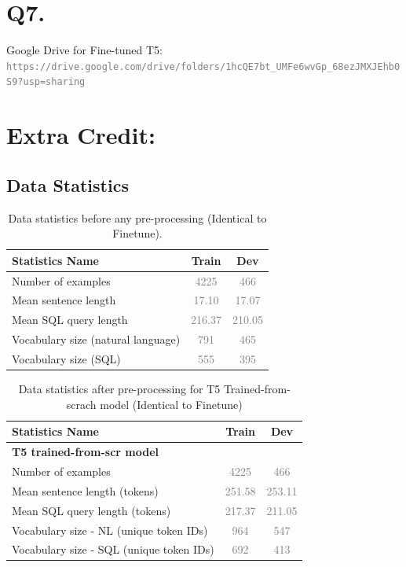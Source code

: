 \documentclass{article}
\begin{document}
\section*{Q7.}

Google Drive for Fine-tuned T5: \\
\textcolor{gray}{\nolinkurl{https://drive.google.com/drive/folders/1hcQE7bt_UMFe6wvGp_68ezJMXJEhb0S9?usp=sharing}}

\section*{Extra Credit: }

\subsection*{Data Statistics}
\begin{table}[h!]
\centering
\begin{tabular}{lcc}
\toprule
Statistics Name & Train & Dev \\
\midrule
Number of examples & \textcolor{gray}{4225} & \textcolor{gray}{466} \\
Mean sentence length & \textcolor{gray}{17.10}& \textcolor{gray}{17.07} \\
Mean SQL query length & \textcolor{gray}{216.37}& \textcolor{gray}{210.05}  \\
Vocabulary size (natural language)& \textcolor{gray}{791}& \textcolor{gray}{465}  \\
Vocabulary size (SQL)& \textcolor{gray}{555}& \textcolor{gray}{395}  \\
\bottomrule
\end{tabular}
\caption{Data statistics before any pre-processing (Identical to Finetune).}
\label{tab:data_stats_before}
\end{table}
\begin{table}[h!]
\centering
\begin{tabular}{lcc}
\toprule
Statistics Name & Train & Dev \\
\midrule
\multicolumn{3}{l}{\textbf{T5 trained-from-scr model}} \\ %
Number of examples & \textcolor{gray}{4225} & \textcolor{gray}{466} \\
Mean sentence length (tokens)& \textcolor{gray}{251.58}& \textcolor{gray}{253.11} \\
Mean SQL query length (tokens)& \textcolor{gray}{217.37}& \textcolor{gray}{211.05}  \\
Vocabulary size - NL (unique token IDs)& \textcolor{gray}{964}& \textcolor{gray}{547}  \\
Vocabulary size - SQL (unique token IDs)& \textcolor{gray}{692}& \textcolor{gray}{413}  \\
\midrule
\bottomrule
\end{tabular}
\caption{Data statistics after pre-processing for T5 Trained-from-scrach model (Identical to Finetune)}
\label{tab:data_stats_after}
\end{table}
\end{document}
